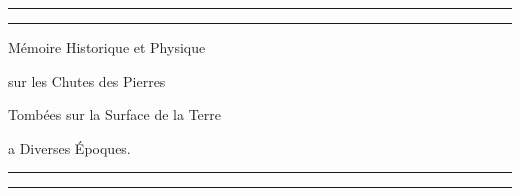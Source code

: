 \documentclass[a4paper, 12pt, oneside, french]{article}
\begin{document}
\Fontauri
\renewcommand{\contentsname}{
\Fontauri{Index}
}
\let\origcftsecfont\cft
\let\origcftsecpagefont\cftsecpagefont
\let\origcftsecafterpnum\cftsecafterpnum
\renewcommand{\cftsecpagefont}{\Fontauri{\origcftsecpagefont}}
\renewcommand{\cftsecafterpnum}{\Fontauri{\origcftsecafterpnum}}
\let\origcftsubsecpagefont\cftsubsecpagefont
\let\origcftsubsecafterpnum\cftsubsecafterpnum
\renewcommand{\cftsubsecpagefont}{\Fontauri{\origcftsubsecpagefont}}
\renewcommand{\cftsubsecafterpnum}{\Fontauri{\origcftsubsecafterpnum}}
\let\origcftsubsubsecpagefont\cftsubsubsecpagefont
\let\origcftsubsubsecafterpnum\cftsubsubsecafterpnum
\renewcommand{\cftsubsubsecpagefont}{\Fontauri{\origcftsubsubsecpagefont}}
\renewcommand{\cftsubsubsecafterpnum}{\Fontauri{\origcftsubsubsecafterpnum}}

\begin{titlepage} %
	\centering %
	\scshape %

	
	\rule{\textwidth}{1.6pt}\vspace*{-\baselineskip}\vspace*{2pt} %
	\rule{\textwidth}{0.4pt} %
	
	\vspace{1.5\baselineskip} %
	
	{\LARGE Mémoire Historique et Physique}

	\vspace{1.2\baselineskip}

	{\LARGE sur les Chutes des Pierres}

 	\vspace{1.2\baselineskip}

	{\LARGE Tombées sur la Surface de la Terre}

 	\vspace{1.2\baselineskip}

	{\LARGE a Diverses Époques.}
 
	\vspace{1\baselineskip} %

	\rule{\textwidth}{0.4pt}\vspace*{-\baselineskip}\vspace{3.2pt} %
	\rule{\textwidth}{1.6pt} %
	

\end{titlepage}
\end{document}
